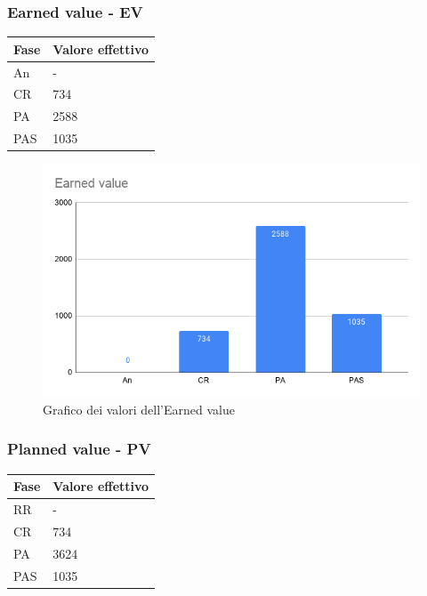 \subsubsection{Earned value - EV}

\begin{longtabu} to \textwidth {| X[0.1,c m] | X[0.1,c m] |}
    \hline
    \textbf{Fase} &
    \textbf{Valore effettivo} \\
    \hline
    An & -  \\ 
    \hline
    CR & 734 \\
    \hline
    PA & 2588 \\
    \hline
    PAS & 1035 \\
    \hline 
    \end{longtabu}

    \begin{figure}[H]
        \centering
        \includegraphics[width=10 cm]{source/sections/images/Earned_value.png}
        \caption{Grafico dei valori dell'Earned value}
    \end{figure}

    \newpage
\subsubsection{Planned value - PV}

\begin{longtabu} to \textwidth {| X[0.1,c m] | X[0.1,c m] | }
    \hline
    \textbf{Fase} &
    \textbf{Valore effettivo} \\
    \hline
    RR & - \\
    \hline
    CR & 734 \\
    \hline
    PA & 3624 \\
    \hline
    PAS & 1035 \\
    \hline 
    \end{longtabu}

